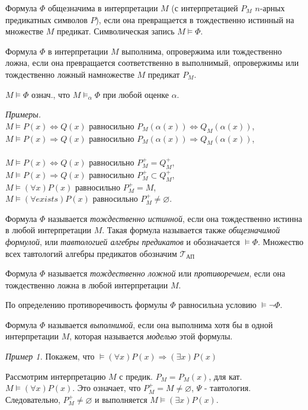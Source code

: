 Формула $\Phi$ общезначима в интерпретации $M$ (с интерпретацией $P_M$ $n$-арных предикатных символов $P$), если она превращается в тождественно истинный на множестве $M$ предикат. Символическая запись $M \vDash \Phi$.

Формула $\Phi$ в интерпретации $M$ выполнима, опровержима или тождественно ложна, если она превращается соответственно в выполнимый, опровержимы или тождественно ложный намножестве $M$ предикат $P_M$.

$M \vDash \Phi$ означ., что $M \vDash_\alpha \Phi$ при любой оценке $\alpha$.

{\it Примеры.} \\
$M \vDash P(x) \Leftrightarrow Q(x)$ равносильно $P_M(\alpha(x)) \Leftrightarrow Q_M(\alpha(x))$, \\
$M \vDash P(x) \Rightarrow Q(x)$ равносильно $P_M(\alpha(x)) \Rightarrow Q_M(\alpha(x))$, \\ \\
$M \vDash P(x) \Leftrightarrow Q(x)$ равносильно $P_M^+ = Q_M^+$, \\
$M \vDash P(x) \Rightarrow Q(x)$ равносильно $P_M^+ \subset Q_M^+$, \\
$M \vDash (\forall x)P(x)$ равносильно $P_M^+ = M$, \\
$M \vDash (\forall exists)P(x)$ равносильно $P_M^+ \neq \varnothing$.


\dftion Формула $\Phi$ называется {\it тождественно истинной}, если она тождественно истинна в любой интерпретации $M$. Такая формула называется также {\it общезначимой формулой}, или {\it тавтологией алгебры предикатов} и обозначается $\vDash \Phi$. Множество всех тавтологий алгебры предикатов обозначим $\mathscr{T}_{\text{АП}}$

\dftion Формула $\Phi$ называется {\it тождественно ложной} или {\it противоречием}, если она тождественно ложна в любой интерпретации $M$.

По определению противоречивость формулы $\Phi$ равносильна условию $\vDash \neg \Phi$.

\dftion Формула $\Phi$ называется {\it выполнимой}, если она выполнима хотя бы в одной интерпретации $M$, которая называется {\it моделью} этой формулы.

{\it Пример 1.} Покажем, что $\vDash (\forall x)P(x) \Rightarrow (\exists x)P(x)$

Рассмотрим интерпретацию $M$ с предик. $P_M=P_M(x)$, для кат. $M \vDash (\forall x)P(x)$. Это означает, что $P_M^+ = M \neq \varnothing$, $\Psi$ - тавтология. Следовательно, $P_M^+ \neq \varnothing$ и выполняется $M \vDash (\exists x)P(x)$.

